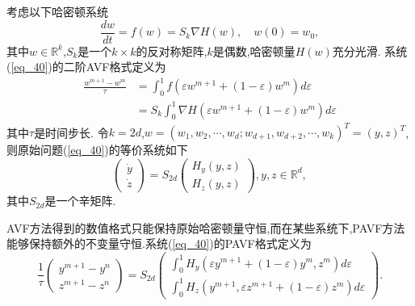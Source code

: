 考虑以下哈密顿系统
\begin{equation}
\frac{d w}{d t}=f(w)=S_{k} \nabla H(w), \quad w(0)=w_{0},
\label{eq_40}\end{equation}
其中$w \in \mathbb{R}^{k}$,$S_{k}$是一个$k \times k$的反对称矩阵,$k$是偶数,哈密顿量$H(w)$充分光滑.
系统(\ref{eq_40})的二阶AVF格式定义为
\begin{equation}
\begin{aligned}
\frac{w^{m+1}-w^{m}}{\tau} &=\int_{0}^{1} f\left(\varepsilon w^{m+1}+(1-\varepsilon) w^{m}\right) d \varepsilon \\
&=S_{k} \int_{0}^{1} \nabla H\left(\varepsilon w^{m+1}+(1-\varepsilon) w^{m}\right) d \varepsilon
\end{aligned}
\label{eq_41}\end{equation}
其中$\tau$是时间步长.
令$k=2d$,$w=\left(w_{1}, w_{2}, \cdots, w_{d} ; w_{d+1}, w_{d+2}, \cdots, w_{k}\right)^{T}=(y, z)^{T}$,则原始问题(\ref{eq_40})的等价系统如下
\begin{equation}
\left(\begin{array}{l}
\dot{y} \\
\dot{z}
\end{array}\right)=S_{2 d}\left(\begin{array}{c}
H_{y}(y, z) \\
H_{z}(y, z)
\end{array}\right), y, z \in \mathbb{R}^{d},
\label{eq_42}\end{equation}
其中$S_{2 d}$是一个辛矩阵.

AVF方法得到的数值格式只能保持原始哈密顿量守恒,而在某些系统下,PAVF方法能够保持额外的不变量守恒.系统(\ref{eq_40})的PAVF格式定义为
\begin{equation}
\frac{1}{\tau}\left(\begin{array}{c}
y^{m+1}-y^{n} \\
z^{m+1}-z^{n}
\end{array}\right)=S_{2 d}\left(\begin{array}{c}
\int_{0}^{1} H_{y}\left(\varepsilon y^{m+1}+(1-\varepsilon) y^{m}, z^{m}\right) d \varepsilon \\
\int_{0}^{1} H_{z}\left(y^{m+1}, \varepsilon z^{m+1}+(1-\varepsilon) z^{m}\right) d \varepsilon
\end{array}\right) .
\label{eq_43}\end{equation}

